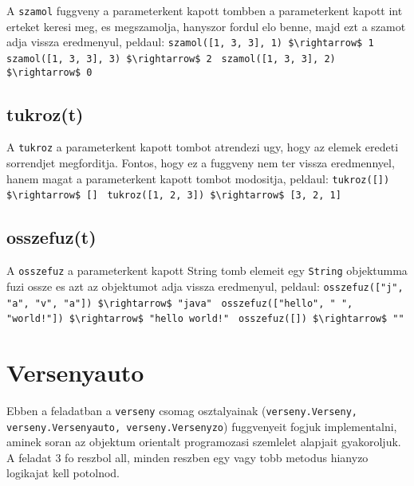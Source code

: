 \documentclass{article}
\begin{document}
A \lstinline{szamol} fuggveny a parameterkent kapott tombben a parameterkent kapott int erteket keresi meg, es megszamolja, hanyszor fordul elo benne, majd ezt a szamot adja vissza eredmenyul, peldaul:\newline
\lstinline[mathescape]{szamol([1, 3, 3], 1) $\rightarrow$ 1 }\newline
\lstinline[mathescape]{szamol([1, 3, 3], 3) $\rightarrow$ 2 }\newline
\lstinline[mathescape]{szamol([1, 3, 3], 2) $\rightarrow$ 0 }\newline

\subsection{tukroz(t)}

A \lstinline{tukroz} a parameterkent kapott tombot atrendezi ugy, hogy az elemek eredeti sorrendjet megforditja. Fontos, hogy ez a fuggveny nem ter vissza eredmennyel, hanem magat a parameterkent kapott tombot modositja, peldaul:\newline
\lstinline[mathescape]{tukroz([]) $\rightarrow$ [] }\newline
\lstinline[mathescape]{tukroz([1, 2, 3]) $\rightarrow$ [3, 2, 1]}\newline

\subsection{osszefuz(t)}

A \lstinline{osszefuz} a parameterkent kapott String tomb elemeit egy \lstinline{String} objektumma fuzi ossze es azt az objektumot adja vissza eredmenyul, peldaul:\newline
\lstinline[mathescape]{osszefuz(["j", "a", "v", "a"]) $\rightarrow$ "java" }\newline
\lstinline[mathescape]{osszefuz(["hello", " ", "world!"]) $\rightarrow$ "hello world!" }\newline
\lstinline[mathescape]{osszefuz([]) $\rightarrow$ "" }\newline

\newpage

\section{Versenyauto}

Ebben a feladatban a \lstinline{verseny} csomag osztalyainak (\lstinline|verseny.Verseny,|\\\lstinline|verseny.Versenyauto, verseny.Versenyzo|) fuggvenyeit fogjuk implementalni, aminek soran az objektum orientalt programozasi szemlelet alapjait gyakoroljuk. A feladat 3 fo reszbol all, minden reszben egy vagy tobb metodus hianyzo logikajat kell potolnod.
\end{document}
